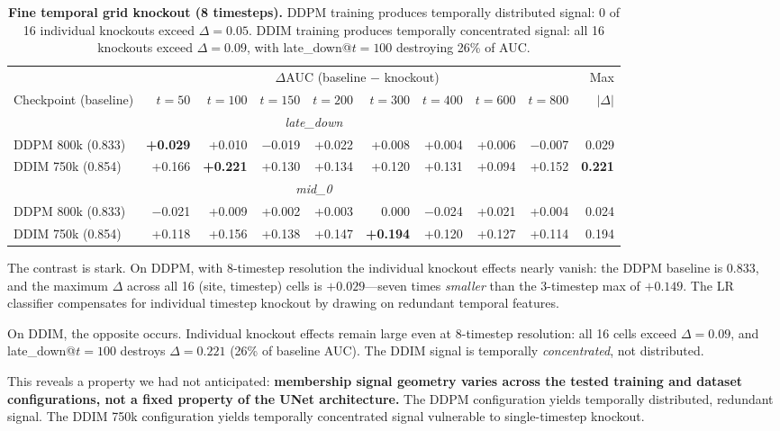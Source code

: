 \documentclass[10pt,conference]{IEEEtran}
\begin{document}
\begin{table}[t]
\centering
\caption{\textbf{Fine temporal grid knockout (8 timesteps).}
DDPM training produces temporally distributed signal: 0 of 16 individual
knockouts exceed $\Delta{=}0.05$. DDIM training produces temporally
concentrated signal: all 16 knockouts exceed $\Delta{=}0.09$, with
late\_down@$t{=}100$ destroying 26\% of AUC.}
\label{tab:fine-temporal}
\centering
\footnotesize
\setlength{\tabcolsep}{3pt}
\begin{tabular}{lrrrrrrrrr}
\toprule
& \multicolumn{8}{c}{$\Delta$AUC (baseline $-$ knockout)} & Max \\
\cmidrule(lr){2-9}
Checkpoint (baseline) & $t{=}50$ & $t{=}100$ & $t{=}150$ & $t{=}200$ & $t{=}300$ & $t{=}400$ & $t{=}600$ & $t{=}800$ & $|\Delta|$ \\
\midrule
\multicolumn{10}{c}{\textit{late\_down}} \\
\midrule
DDPM 800k (0.833) & \textbf{+0.029} & +0.010 & $-$0.019 & +0.022 & +0.008 & +0.004 & +0.006 & $-$0.007 & 0.029 \\
DDIM 750k (0.854) & +0.166 & \textbf{+0.221} & +0.130 & +0.134 & +0.120 & +0.131 & +0.094 & +0.152 & \textbf{0.221} \\
\midrule
\multicolumn{10}{c}{\textit{mid\_0}} \\
\midrule
DDPM 800k (0.833) & $-$0.021 & +0.009 & +0.002 & +0.003 & 0.000 & $-$0.024 & +0.021 & +0.004 & 0.024 \\
DDIM 750k (0.854) & +0.118 & +0.156 & +0.138 & +0.147 & \textbf{+0.194} & +0.120 & +0.127 & +0.114 & 0.194 \\
\bottomrule
\end{tabular}
\end{table}

The contrast is stark. On DDPM, with 8-timestep resolution the individual
knockout effects nearly vanish: the DDPM baseline is 0.833, and the maximum
$\Delta$ across all 16 (site, timestep) cells is ${+}0.029$---seven times
\textit{smaller} than the 3-timestep max of ${+}0.149$. The LR classifier
compensates for individual timestep knockout by drawing on redundant temporal
features.

On DDIM, the opposite occurs. Individual knockout effects remain large even
at 8-timestep resolution: all 16 cells exceed $\Delta{=}0.09$, and
late\_down@$t{=}100$ destroys $\Delta{=}0.221$ (26\% of baseline AUC).
The DDIM signal is temporally \emph{concentrated}, not distributed.

This reveals a property we had not anticipated: \textbf{membership signal
geometry varies across the tested training and dataset configurations, not a fixed property of
the UNet architecture.} The DDPM configuration yields temporally distributed, redundant signal. The DDIM 750k configuration yields temporally concentrated signal
vulnerable to single-timestep knockout.
\end{document}
